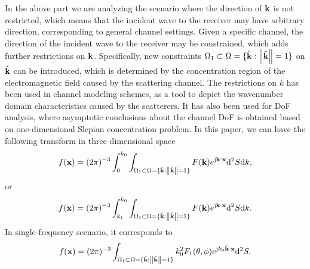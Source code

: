 \documentclass[12pt,draftclsnofoot,journal,onecolumn]{IEEEtran}
\begin{document}
	In the above part we are analyzing the scenario where the direction of ${\bf k}$ is not restricted, which means that the incident wave to the receiver may have arbitrary direction, corresponding to general channel settings. Given a specific channel, the direction of the incident wave to the receiver may be constrained, which adds further restrictions on ${\bf k}$.  Specifically, new constraints ${\Omega}_1 \subset {\Omega}=\{\hat{\bf k}: \left\| \hat{\bf k} \right\|=1\}$ on $\hat{\bf k}$ can be introduced, which is determined by the concentration region of the electromagnetic field caused by the scattering channel. {\color{red} The restrictions on $k$ has been used in channel modeling schemes\cite{pizzo2022fourier}, as a tool to depict the wavenumber domain characteristics caused by the scatterers.
	It has also been used for DoF analysis\cite{poon2005degrees}, where asymptotic conclusions about the channel DoF is obtained based on one-dimensional Slepian concentration problem. } In this paper, we can have the following transform in three dimensional space
	\begin{equation}
		\begin{aligned}
			f({\bf x})=(2\pi)^{-3}\int_0^{k_0} \int_{{\Omega}_1 \subset {\Omega}=\{\hat{\bf k}: \left\| \hat{\bf k} \right\|=1\}} F({\bf k})e^{{\rm j}{\bf k}\cdot {\bf x}}{\rm d}^2S {\rm d}{k},
		\end{aligned}
		\label{eqn_wavenumber_constraint1}
	\end{equation}
	or
	\begin{equation}
		\begin{aligned}
			f({\bf x})=(2\pi)^{-3}\int_{k_1}^{k_0} \int_{{\Omega}_1 \subset {\Omega}=\{\hat{\bf k}: \left\| \hat{\bf k} \right\|=1\}} F({\bf k})e^{{\rm j}{\bf k}\cdot {\bf x}}{\rm d}^2S {\rm d}{k}.
		\end{aligned}
		\label{eqn_wavenumber_constraint2}
	\end{equation}
	In single-frequency scenario, it corresponds to
	\begin{equation}
		\begin{aligned}
			f({\bf x})=(2\pi)^{-3}\int_{{\Omega}_1 \subset {\Omega}=\{\hat{\bf k}: \left\| \hat{\bf k} \right\|=1\}}k_0^2F_1(\theta,\phi)e^{{\rm j}k_0\hat{\bf k}\cdot {\bf x}}{\rm d}^2S.
		\end{aligned}
		\label{eqn_wavenumber_constraint3}
	\end{equation}
\end{document}
